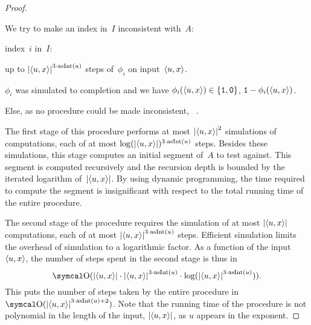 \begin{proof}
\begin{codelisting}
    We try to make an index in~$I$ inconsistent with~$A$:
    \begin{codelisting}
    \item
       index~$i$ in~$I$:
      \begin{codelisting}
      \item
         up to $\length{\pair{u}{x}}^{3 \cdot \asNat(u)}$ steps of~$\phi_i$ on input~$\pair{u}{x}$.
      \item
         $\phi_i$ was simulated to completion and we have $\phi_i(\pair{u}{x}) \in \{\bits{1}, \bits{0}\}$,
        \itemcont {} $\bits{1} - \phi_i(\pair{u}{x})$.
      \end{codelisting}
    \item
      Else, as no procedure could be made inconsistent, ~.
    \end{codelisting}
  \end{codelisting}

  The first stage of this procedure performs at most ${\lvert{\langle u, x\rangle}\rvert}^2$ simulations of computations, each of at most $\log({\lvert{\langle u, x\rangle}\rvert})^{3 \cdot \operatorname{asInt}(u)}$ steps.
  Besides these simulations, this stage computes an initial segment of~$A$ to test against.
  This segment is computed recursively and the recursion depth is bounded by the iterated logarithm of~${\lvert{\langle u, x\rangle}\rvert}$.
  By using dynamic programming, the time required to compute the segment is insignificant with respect to the total running time of the entire procedure.

  The second stage of the procedure requires the simulation of at most ${\lvert{\langle u, x\rangle}\rvert}$ computations, each of at most ${\lvert{\langle u, x\rangle}\rvert}^{3 \cdot \operatorname{asInt}(u)}$ steps.
  Efficient simulation \parencite{arora2009computational} limits the overhead of simulation to a logarithmic factor.
  As a function of the input~${\langle u, x\rangle}$, the number of steps spent in the second stage is thus in
  \begin{equation*}
    \bigO(\length{\pair{u}{x}} \cdot \length{\pair{u}{x}}^{3 \cdot \asNat(u)} \cdot \log(\length{\pair{u}{x}}^{3 \cdot \asNat(u)})).
  \end{equation*}
  This puts the number of steps taken by the entire procedure in $\bigO(\length{\pair{u}{x}}^{3 \cdot \asNat(u) + 2})$.
  Note that the running time of the procedure is not polynomial in the length of the input, ${\lvert{\langle u, x\rangle}\rvert}$, as $u$ appears in the exponent.


\end{proof}
